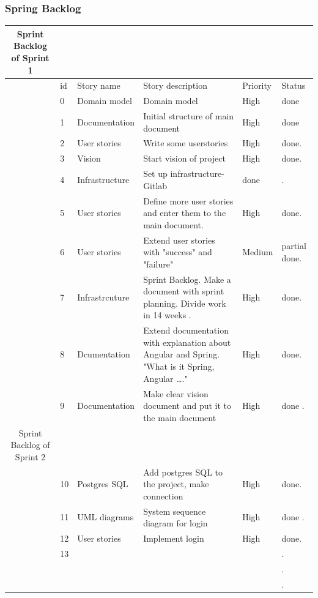 \documentclass{scrartcl}
\begin{document}
\subsubsection{Spring Backlog}
\begin{table}[ht]
    \centering
    \begin{tabular}{c@{\qquad}lllll}
   Sprint Backlog of Sprint 1\\
    
        \toprule
           & id & Story name & Story description & Priority & Status\\
        \midrule
        & 0 & Domain model & Domain model & High & done \\ \hline
        & 1 & Documentation  & Initial structure of main document & High & done \\ \hline
        
         &  2 &  User stories  & Write some userstories  & High & done. \\ \hline
          & 3 &  Vision &  Start vision of project & High  & done. \\ \hline
           & 4 & Infrastructure & Set up infrastructure- Gitlab & done & . \\ \hline
            & 5 &  User stories & Define more user stories and enter them to the main document. & High & done. \\ \hline
             & 6 & User stories & Extend user stories with "success" and "failure" & Medium & partial done. \\ \hline
              & 7 & Infrastrcuture & Sprint Backlog. Make a document with sprint planning. Divide work in 14 weeks .  & High &  done. \\ \hline
               & 8 & Dcumentation & Extend documentation with explanation about Angular and Spring. "What is it Spring, Angular …." & High & done. \\ \hline
               & 9 & Documentation & Make clear vision document and put it to the main document & High & done . \\ \hline
               
                Sprint Backlog of Sprint 2 \\
                 & 10 & Postgres SQL & Add postgres SQL to the project, make connection & High & done. \\ \hline
                  &  11& UML diagrams & System sequence diagram for login & High & done . \\ \hline
                   & 12 &  User stories &  Implement login & High & done. \\ \hline
                    & 13 &  &  &  & . \\ \hline
                     &  &  &  &  & . \\ \hline
                      &  &  &  &  & . \\ \hline
                    

\end{tabular}
\end{table}
\end{document}

